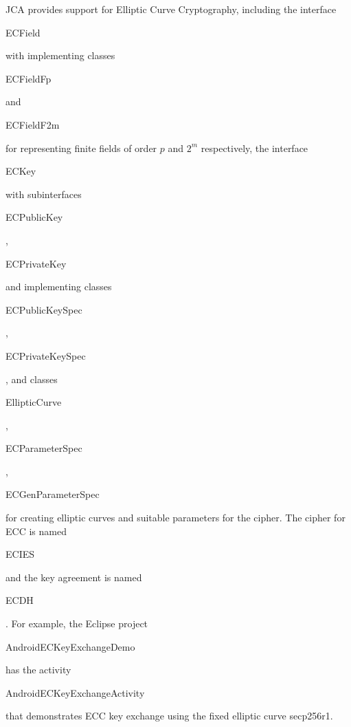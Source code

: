 JCA provides support for Elliptic Curve Cryptography, including
the interface \begin{code}ECField\end{code}
with implementing classes \begin{code}ECFieldFp\end{code} and \begin{code}ECFieldF2m\end{code}
for representing finite fields of order $p$ and $2^m$ respectively,
the interface \begin{code}ECKey\end{code} with subinterfaces
\begin{code}ECPublicKey\end{code}, \begin{code}ECPrivateKey\end{code}
and implementing classes \begin{code}ECPublic\-KeySpec\end{code},
\begin{code}ECPrivateKeySpec\end{code}, and classes
\begin{code}EllipticCurve\end{code}, \begin{code}ECParameterSpec\end{code},
\begin{code}ECGenParameterSpec\end{code} for creating elliptic curves and suitable
parameters for the cipher. The cipher for ECC is named \begin{code}ECIES\end{code}
and the key agreement is named \begin{code}ECDH\end{code}.
For example, the Eclipse project \begin{code}AndroidECKeyExchangeDemo\end{code}
has the activity \begin{code}AndroidECKeyExchangeActivity\end{code}
that demonstrates ECC key exchange using the fixed elliptic curve secp256r1.


